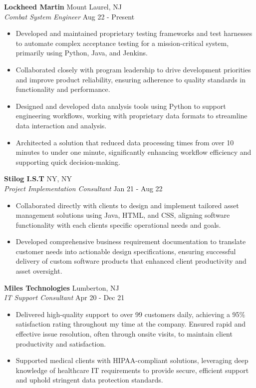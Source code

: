 \documentclass[letterpaper,11pt]{article}
\begin{document}
\textbf{Lockheed Martin} \hfill Mount Laurel, NJ\\
\textit{Combat System Engineer} \hfill Aug 22\textquotesingle{} - Present\\
\vspace{-1mm}
\begin{itemize} \itemsep 1pt
	\item Developed and maintained proprietary testing frameworks and test harnesses to automate complex acceptance testing for a mission-critical system, primarily using Python, Java, and Jenkins.
	\item Collaborated closely with program leadership to drive development priorities and improve product reliability, ensuring adherence to quality standards in functionality and performance.
	\item Designed and developed data analysis tools using Python to support engineering workflows, working with proprietary data formats to streamline data interaction and analysis.
	\item Architected a solution that reduced data processing times from over 10 minutes to under one minute, significantly enhancing workflow efficiency and supporting quick decision-making.
\end{itemize}
\textbf{Stilog I.S.T} \hfill NY, NY\\
\textit{Project Implementation Consultant} \hfill Jan 21\textquotesingle{} - Aug 22\textquotesingle{}\\
\vspace{-2mm}
\begin{itemize} \itemsep 0pt
	\item Collaborated directly with clients to design and implement tailored asset management solutions using Java, HTML, and CSS, aligning software functionality with each client\textquotesingle{}s specific operational needs and goals.
	\item Developed comprehensive business requirement documentation to translate customer needs into actionable design specifications, ensuring successful delivery of custom software products that enhanced client productivity and asset oversight.
\end{itemize}
\textbf{Miles Technologies} \hfill Lumberton, NJ\\
\textit{IT Support Consultant} \hfill Apr 20\textquotesingle{} - Dec 21\textquotesingle{}\\
\vspace{-2mm}
\begin{itemize} \itemsep 0pt
	\item Delivered high-quality support to over 99 customers daily, achieving a 95\% satisfaction rating throughout my time at the company. Ensured rapid and effective issue resolution, often through onsite visits, to maintain client productivity and satisfaction.
	\item Supported medical clients with HIPAA-compliant solutions, leveraging deep knowledge of healthcare IT requirements to provide secure, efficient support and uphold stringent data protection standards.
\end{itemize}
\end{document}
